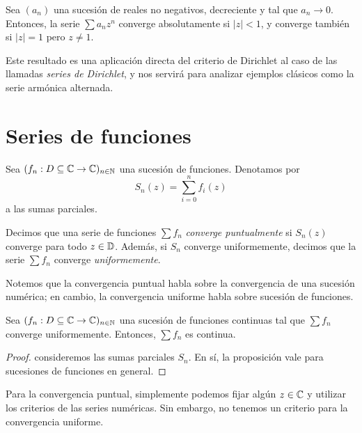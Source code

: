 \begin{remark}
    Sea $(a_n)$ una sucesión de reales no negativos, decreciente y tal que $a_n \to 0$. 
    Entonces, la serie $\sum a_n z^n$ converge absolutamente si $|z| < 1$, y converge también si $|z|=1$ pero $z \neq 1$.
\end{remark}

Este resultado es una aplicación directa del criterio de Dirichlet al caso de las llamadas 
\textit{series de Dirichlet}, y nos servirá para analizar ejemplos clásicos como la serie armónica alternada.


\section{Series de funciones}

Sea $(f_n: D \subseteq \mathbb{C} \to \mathbb{C})_{n \in \mathbb{N}}$ una sucesión de funciones. Denotamos por
\begin{equation*}
    S_n(z) = \sum_{i=0}^n f_i(z)
\end{equation*}
a las sumas parciales.

\begin{definition}
    Decimos que una serie de funciones $\sum f_n$ \emph{converge puntualmente} si $S_n(z)$ converge para todo $z \in \mathbb{D}$. Además, si $S_n$ converge uniformemente, decimos que la serie $\sum f_n$ converge \emph{uniformemente}.
\end{definition}

\begin{remark}
    Notemos que la convergencia puntual habla sobre la convergencia de una sucesión numérica; en cambio, la convergencia uniforme habla sobre sucesión de funciones.
\end{remark}

\begin{proposition}
    Sea $(f_n: D \subseteq \mathbb{C} \to \mathbb{C})_{n \in \mathbb{N}}$ una sucesión de funciones continuas tal que $\sum f_n$ converge uniformemente. Entonces, $\sum f_n$ es continua.
\end{proposition}

\begin{proof}
    consideremos las sumas parciales $S_n$. En sí, la proposición vale para sucesiones de funciones en general.
\end{proof}

Para la convergencia puntual, simplemente podemos fijar algún $z \in \mathbb{C}$ y utilizar los criterios de las series numéricas. Sin embargo, no tenemos un criterio para la convergencia uniforme.

